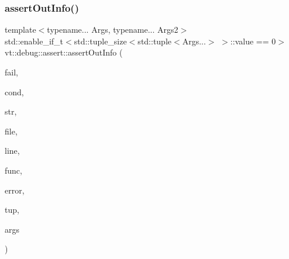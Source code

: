\subsubsection{\texorpdfstring{assert\+Out\+Info()}{assertOutInfo()}\hspace{0.1cm}{\footnotesize\ttfamily [1/3]}}
{\footnotesize\ttfamily template$<$typename... Args, typename... Args2$>$ \\
std\+::enable\+\_\+if\+\_\+t$<$std\+::tuple\+\_\+size$<$std\+::tuple$<$Args...$>$ $>$\+::value == 0$>$ vt\+::debug\+::assert\+::assert\+Out\+Info (\begin{DoxyParamCaption}\item[{bool}]{fail,  }\item[{std\+::string const}]{cond,  }\item[{std\+::string const \&}]{str,  }\item[{std\+::string const \&}]{file,  }\item[{int const}]{line,  }\item[{std\+::string const \&}]{func,  }\item[{\hyperlink{namespacevt_a793764d753923abc3d32929870beb485}{Error\+Code\+Type}}]{error,  }\item[{std\+::tuple$<$ Args2... $>$ \&\&}]{tup,  }\item[{std\+::tuple$<$ Args... $>$ \&\&}]{args }\end{DoxyParamCaption})\hspace{0.3cm}{\ttfamily [inline]}}

\mbox{\label{namespacevt_1_1debug_1_1assert_a3c1f6e032dcdebf55e8d92a162589118}} 
